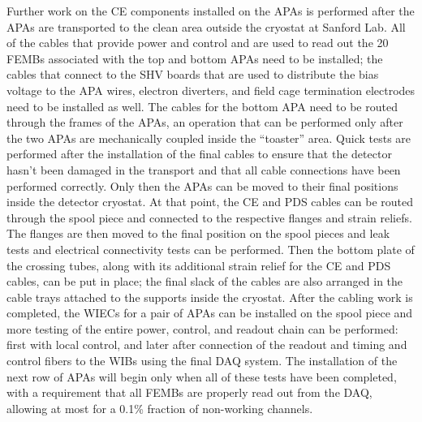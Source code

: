 Further work on the CE components installed on the APAs is performed after
the APAs are transported to the clean area outside the cryostat at
Sanford Lab. All of the cables that provide power and control and are used
to read out the 20 FEMBs associated with the top and bottom APAs need to be
installed; the cables that connect to the SHV boards that are used to
distribute the bias voltage to the APA wires, electron diverters, and field cage
termination electrodes need to be installed as well. The cables for the bottom
APA need to be routed through the frames of the APAs, an operation that
can be performed only after the two APAs are mechanically coupled inside
the ``toaster'' area. Quick tests are performed after the installation of the
final cables to ensure that the detector hasn't been damaged in the transport
and that all cable connections have been performed correctly. Only then 
the APAs can be moved to their final positions inside
the detector cryostat. At that point, the CE and PDS cables can be routed
through the spool piece and connected to the respective flanges and strain
reliefs. The flanges are then moved to the final position on the spool pieces
and leak tests and electrical connectivity tests can be performed. Then the
bottom plate of the crossing tubes, along with its additional strain relief for
the CE and PDS cables, can be put in place; the final slack of the cables
are also arranged in the cable trays attached to the supports inside the cryostat.
After the cabling work is completed, the WIECs for a pair of APAs can be
installed on the spool piece and more testing of the entire power, control,
and readout chain can be performed: first with local control, and later
after connection of the readout and timing and control fibers to the WIBs
using the final DAQ system. The installation of the next row of APAs will
begin only when all of these tests have been completed, with a requirement
that all FEMBs are properly read out from the DAQ, allowing at most for
a 0.1\% fraction of non-working channels.

